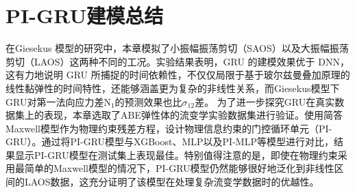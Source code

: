 \section{PI-GRU建模总结}
在Giesekus 模型的研究中，本章模拟了小振幅振荡剪切（SAOS）以及大振幅振荡剪切（LAOS）这两种不同的工况。实验结果表明，GRU 的建模效果优于 DNN，这有力地说明 GRU 所捕捉的时间依赖性，不仅仅局限于基于玻尔兹曼叠加原理的线性黏弹性的时间特性，还能够涵盖更为复杂的非线性关系，而Giesekus模型下GRU对第一法向应力差N$_1$的预测效果也比$\sigma_{12}$差。
为了进一步探究GRU在真实数据集上的表现，本章选取了ABE弹性体的流变学实验数据集进行验证。使用简答Maxwell模型作为物理约束残差方程，设计物理信息约束的门控循环单元（PI-GRU）。通过将PI-GRU模型与XGBoost、MLP以及PI-MLP等模型进行对比，结果显示PI-GRU模型在测试集上表现最佳。特别值得注意的是，即使在物理约束采用最简单的Maxwell模型的情况下，PI-GRU模型仍然能够很好地泛化到非线性区间的LAOS数据，这充分证明了该模型在处理复杂流变学数据时的优越性。